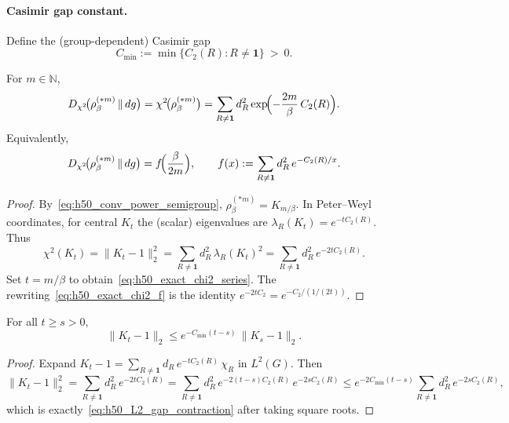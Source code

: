 \paragraph{Casimir gap constant.}
Define the (group-dependent) Casimir gap
\begin{equation}\label{eq:h50_casimir_gap_def}
C_{\min}:=\min\{C_2(R):R\neq \mathbf 1\}\ >\ 0.
\end{equation}

\begin{lemma}\label{lem:h50_chi2_heat_kernel_exact}
For $m\in\mathbb N$,
\begin{equation}\label{eq:h50_exact_chi2_series}
D_{\chi^2}\!\bigl(\rho_\beta^{(*m)}\,\|\,dg\bigr)
=\chi^2\!\bigl(\rho_\beta^{(*m)}\bigr)
=\sum_{R\neq\mathbf 1} d_R^2\exp\!\Bigl(-\frac{2m}{\beta}\,C_2(R)\Bigr).
\end{equation}
Equivalently,
\begin{equation}\label{eq:h50_exact_chi2_f}
D_{\chi^2}\!\bigl(\rho_\beta^{(*m)}\,\|\,dg\bigr)
=f\!\Bigl(\frac{\beta}{2m}\Bigr),
\qquad
f(x):=\sum_{R\neq\mathbf 1} d_R^2\,e^{-C_2(R)/x}.
\end{equation}
\end{lemma}

\begin{proof}
By~\eqref{eq:h50_conv_power_semigroup}, $\rho_\beta^{(*m)}=K_{m/\beta}$.
In Peter--Weyl coordinates, for central $K_t$ the (scalar) eigenvalues are $\lambda_R(K_t)=e^{-tC_2(R)}$.
Thus
\[
\chi^2(K_t)=\|K_t-1\|_2^2=\sum_{R\ne\mathbf 1} d_R^2\,\lambda_R(K_t)^2
=\sum_{R\ne\mathbf 1} d_R^2\,e^{-2tC_2(R)}.
\]
Set $t=m/\beta$ to obtain~\eqref{eq:h50_exact_chi2_series}. The rewriting~\eqref{eq:h50_exact_chi2_f} is the identity
$e^{-2tC_2}=e^{-C_2/(1/(2t))}$.
\end{proof}

\begin{lemma}\label{lem:h50_L2_contraction_gap}
For all $t\ge s>0$,
\begin{equation}\label{eq:h50_L2_gap_contraction}
\|K_t-1\|_2 \le e^{-C_{\min}(t-s)}\,\|K_s-1\|_2.
\end{equation}
\end{lemma}

\begin{proof}
Expand $K_t-1=\sum_{R\ne\mathbf 1} d_R\,e^{-tC_2(R)}\,\chi_R$ in $L^2(G)$.
Then
\[
\|K_t-1\|_2^2=\sum_{R\ne\mathbf 1} d_R^2\,e^{-2tC_2(R)}
=\sum_{R\ne\mathbf 1} d_R^2\,e^{-2(t-s)C_2(R)}\,e^{-2sC_2(R)}
\le e^{-2C_{\min}(t-s)}\sum_{R\ne\mathbf 1} d_R^2\,e^{-2sC_2(R)},
\]
which is exactly~\eqref{eq:h50_L2_gap_contraction} after taking square roots.
\end{proof}

